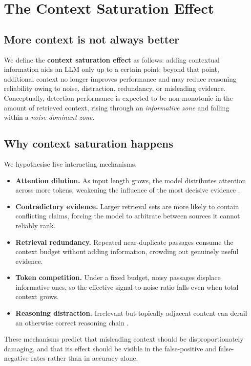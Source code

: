 \documentclass[11pt]{article}
\begin{document}
\section{The Context Saturation Effect}
\label{sec:saturation}

\subsection{More context is not always better}
We define the \textbf{context saturation effect} as follows: adding contextual information aids an LLM only up to a certain point; beyond that point, additional context no longer improves performance and may reduce reasoning reliability owing to noise, distraction, redundancy, or misleading evidence. Conceptually, detection performance is expected to be non-monotonic in the amount of retrieved context, rising through an \emph{informative zone} and falling within a \emph{noise-dominant zone}.

\subsection{Why context saturation happens}
We hypothesise five interacting mechanisms.
\begin{itemize}
  \item \textbf{Attention dilution.} As input length grows, the model distributes attention across more tokens, weakening the influence of the most decisive evidence \citep{liu2024lost}.
  \item \textbf{Contradictory evidence.} Larger retrieval sets are more likely to contain conflicting claims, forcing the model to arbitrate between sources it cannot reliably rank.
  \item \textbf{Retrieval redundancy.} Repeated near-duplicate passages consume the context budget without adding information, crowding out genuinely useful evidence.
  \item \textbf{Token competition.} Under a fixed budget, noisy passages displace informative ones, so the effective signal-to-noise ratio falls even when total context grows.
  \item \textbf{Reasoning distraction.} Irrelevant but topically adjacent content can derail an otherwise correct reasoning chain \citep{shi2023distracted}.
\end{itemize}
These mechanisms predict that misleading context should be disproportionately damaging, and that its effect should be visible in the false-positive and false-negative rates rather than in accuracy alone.
\end{document}
